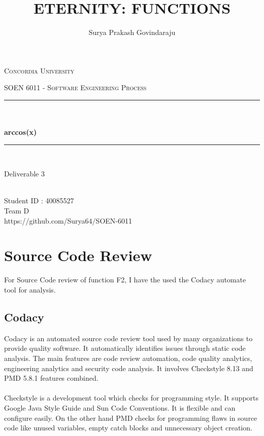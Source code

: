 \documentclass[12pt]{report}
\title{ETERNITY: FUNCTIONS}
\author{Surya Prakash Govindaraju}
\date{}
\makeatletter
\let\thetitle\@title
\let\theauthor\@author
\makeatother
\begin{document}
\begin{titlepage}
	\centering
    \vspace*{0.5 cm}
\begin{center}    \textsc{\Large Concordia University}\\[2.0 cm]	\end{center}
	\textsc{\Large  SOEN 6011 - Software Engineering Process }\\[0.5 cm]
	\rule{\linewidth}{0.2 mm} \\[0.4 cm]
	{ \huge \textbf \thetitle}\\[0.2 cm]
	{ \huge \textbf{arccos(x)}}
	\rule{\linewidth}{0.2 mm} \\[1.5 cm]

\begin{center}   {\Large Deliverable 3}\\[2.0 cm]
\end{center}	
\begin{center}   {\Large \textbf{\theauthor}} \\[0.2 cm]
                 {\large Student ID : 40085527 }\\[0.2 cm]
                 {\large Team D }\\[2.0 cm]	
                 {\large https://github.com/Surya64/SOEN-6011}
\end{center}
	
\end{titlepage}

\tableofcontents
\pagebreak

\renewcommand{\thesection}{\arabic{section}}
\section{Source Code Review}
For Source Code review of function F2, I have the used the Codacy automate tool for analysis.
\subsection{Codacy}
Codacy is an automated source code review tool used by many organizations to provide quality software. It automatically identifies issues through static code analysis. The main features are code review automation, code quality analytics, engineering analytics and security code analysis. It involves Checkstyle 8.13 and PMD 5.8.1 features combined. 
\paragraph{}Checkstyle is a development tool which checks for programming style. It supports Google Java Style Guide and Sun Code Conventions. It is flexible and can configure easily. On the other hand PMD checks for programming flaws in source code like unused variables, empty catch blocks and unnecessary object creation. 
\end{document}
